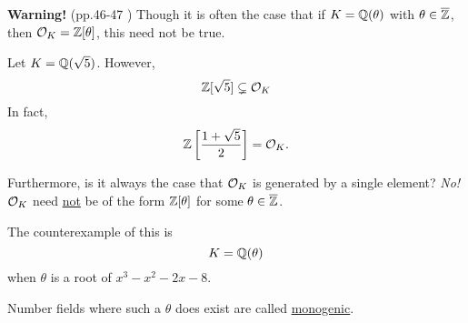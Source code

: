 \textbf{Warning!} (pp.46-47 \cite{stewart2015algebraic}) Though it is often the case that if $K = \mathbb Q(\theta)$ with $\theta\in\overline{\mathbb Z}$, then $\mathcal{O}_K = \mathbb Z[\theta]$, this need not be true.
\begin{example}
    Let $K = \mathbb Q(\sqrt{5})$. However,
    \[\mathbb Z[\sqrt{5}]\subsetneq \mathcal{O}_K\]
    In fact, \[\mathbb Z\left[ \frac{1+\sqrt{5}}{2} \right] = \mathcal{O}_K.\]
\end{example}
Furthermore, is it always the case that $\mathcal{O}_K$ is generated by a single element? \emph{No!} $\mathcal{O}_K$ need \ul{not} be of the form $\mathbb Z[\theta]$ for some $\theta\in\overline{\mathbb Z}$.
\begin{example}
    The counterexample of this is
    \[K = \mathbb Q(\theta)\]
    when $\theta$ is a root of $x^3 - x^2 - 2x - 8$.
\end{example}
Number fields where such a $\theta$ does exist are called \ul{monogenic}.